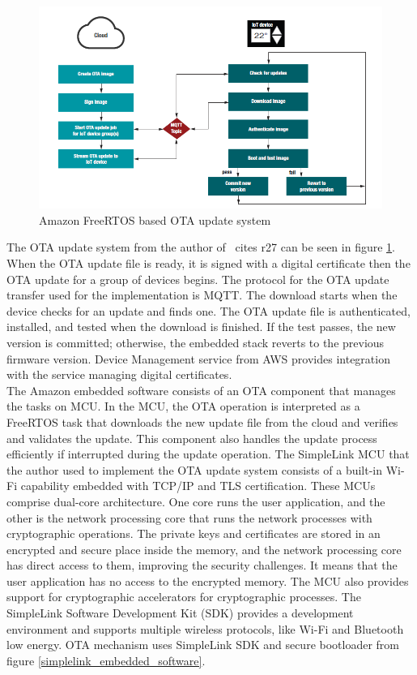 \documentclass[12pt,a4paper]{article}
\begin{document}
\begin{figure}[H]
\centering
\includegraphics[scale=0.75]{amazon_ota.PNG}
\caption{Amazon FreeRTOS based OTA update system \cite{r27}}
\label{amazon_ota}
\end{figure}

The OTA update system from the author of \ cites {r27} can be seen in figure \ref{amazon_ota}. When the OTA update file is ready, it is signed with a digital certificate then the OTA update for a group of devices begins. The protocol for the OTA update transfer used for the implementation is MQTT. The download starts when the device checks for an update and finds one. The OTA update file is authenticated, installed, and tested when the download is finished. If the test passes, the new version is committed; otherwise, the embedded stack reverts to the previous firmware version. Device Management service from AWS provides integration with the service managing digital certificates. \cite{r27} \\

The Amazon embedded software consists of an OTA component that manages the tasks on MCU. In the MCU, the OTA operation is interpreted as a FreeRTOS task that downloads the new update file from the cloud and verifies and validates the update. This component also handles the update process efficiently if interrupted during the update operation. The SimpleLink MCU that the author used to implement the OTA update system consists of a built-in Wi-Fi capability embedded with TCP/IP and TLS certification. These MCUs comprise dual-core architecture. One core runs the user application, and the other is the network processing core that runs the network processes with cryptographic operations. The private keys and certificates are stored in an encrypted and secure place inside the memory, and the network processing core has direct access to them, improving the security challenges. It means that the user application has no access to the encrypted memory. The MCU also provides support for cryptographic accelerators for cryptographic processes. The SimpleLink Software Development Kit (SDK) provides a development environment and supports multiple wireless protocols, like Wi-Fi and Bluetooth low energy. OTA mechanism uses SimpleLink SDK and secure bootloader from figure \ref{simplelink_embedded_software}. \cite{r27}
\end{document}
